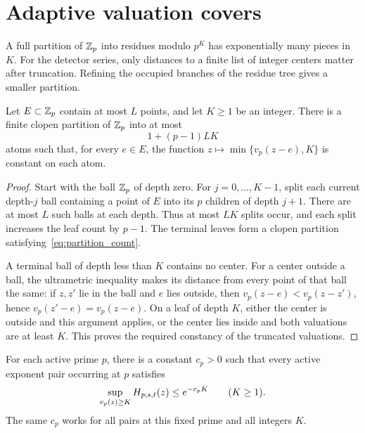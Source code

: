 \section{Adaptive valuation covers}\label{sec:covers}

A full partition of $\mathbb Z_p$ into residues modulo $p^K$ has exponentially
many pieces in $K$. For the detector series, only distances to a finite
list of integer centers matter after truncation. Refining the occupied
branches of the residue tree gives a smaller partition.

\begin{lemma}\label{lem:partition}
Let $E\subset\mathbb Z_p$ contain at most $L$ points, and let $K\geq1$ be an
integer. There is a finite clopen partition of $\mathbb Z_p$ into at most
\begin{equation}\label{eq:partition_count}
 1+(p-1)LK
\end{equation}
atoms such that, for every $e\in E$, the function
$z\mapsto\min\{v_p(z-e),K\}$ is constant on each atom.
\end{lemma}

\begin{proof}
Start with the ball $\mathbb Z_p$ of depth zero. For $j=0,\ldots,K-1$, split
each current depth-$j$ ball containing a point of $E$ into its $p$ children
of depth $j+1$. There are at most $L$ such balls at each depth. Thus at
most $LK$ splits occur, and each split increases the leaf count by $p-1$.
The terminal leaves form a clopen partition satisfying~\eqref{eq:partition_count}.

A terminal ball of depth less than $K$ contains no center. For a center
outside a ball, the ultrametric inequality makes its distance from every
point of that ball the same: if $z,z'$ lie in the ball and $e$ lies outside,
then $v_p(z-e)<v_p(z-z')$, hence $v_p(z'-e)=v_p(z-e)$.
On a leaf of depth $K$, either the center is outside and this argument
applies, or the center lies inside and both valuations are at least $K$.
This proves the required constancy of the truncated valuations.
\end{proof}

\begin{lemma}\label{lem:valuation_tail}
For each active prime $p$, there is a constant $c_p>0$ such that every
active exponent pair occurring at $p$ satisfies
\begin{equation}\label{eq:valuation_tail}
 \sup_{v_p(z)\geq K}H_{p;s,t}(z)\leq e^{-c_pK}
 \qquad(K\geq1).
\end{equation}
The same $c_p$ works for all pairs at this fixed prime and all integers $K$.
\end{lemma}


